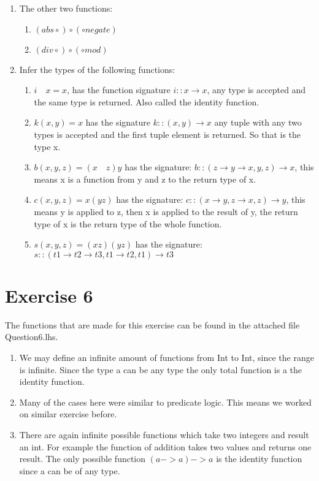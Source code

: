 \documentclass{article}
\begin{document}
\begin{enumerate}
\begin{enumerate}
    \end{enumerate}
    \item The other two functions:
    \begin{enumerate}
        \item $(abs \circ) \circ (\circ negate)$
        \item $(div \circ) \circ (\circ mod)$
    \end{enumerate}
    \item Infer the types of the following functions:
    \begin{enumerate}
        \item $i \quad x = x$, has the function signature $i::x \rightarrow x$, any type is accepted and the same type is returned. Also called the identity function.
        \item $k (x, y) = x$ has the signature $k::(x , y) \rightarrow x$ any tuple with any two types is accepted and the first tuple element is returned. So that is the type x.
        \item $b (x, y, z) = (x \quad z) y$ has the signature: $b :: (z \rightarrow y \rightarrow x, y, z) \rightarrow x$, this means x is a function from y and z to the return type of x.
        \item $c (x, y, z) = x (y z)$ has the signature: $c::(x \rightarrow y, z \rightarrow x, z) \rightarrow y$, this means y is applied to z, then x is applied to the result of y, the return type of x is the return type of the whole function.
        \item $s (x, y, z) = (x z) (y z)$ has the signature: $s::(t1 \rightarrow t2 \rightarrow t3, t1 \rightarrow t2, t1) \rightarrow t3$
    \end{enumerate}
\end{enumerate}

\section*{Exercise 6}
The functions that are made for this exercise can be found in the attached file Question6.lhs.
\begin{enumerate}
  \item We may define an infinite amount of functions from Int to Int, since the range is infinite. Since the type a can be any type the only total function is a the identity function.
  \item Many of the cases here were similar to predicate logic. This means we worked on similar exercise before.
  \item There are again infinite possible functions which take two integers and result an int. For example the function of addition takes two values and returns one result. The only possible function $(a -> a) ->a$ is the identity function since a can be of any type.
\end{enumerate}
\end{document}
